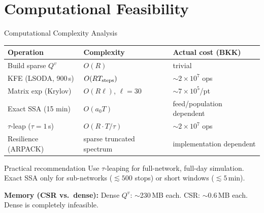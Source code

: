 \documentclass[aspectratio=169,12pt]{beamer}
\begin{document}
\section{Computational Feasibility}
\begin{frame}{Computational Complexity Analysis}
\begin{center}
\begin{tabular}{lll}
\toprule
Operation & Complexity & Actual cost (BKK) \\
\midrule
Build sparse $Q^v$          & $O(R)$               & trivial \\
KFE (LSODA, 900\,s)         & $O(R T_{\rm steps})$ & $\sim2\times10^7$ ops \\
Matrix exp (Krylov)         & $O(R\ell)$, $\ell=30$& $\sim7\times10^5$/pt \\
Exact SSA (15 min)          & $O(a_0 T)$ & feed/population dependent \\
$\tau$-leap ($\tau=1$\,s)   & $O(R\cdot T/\tau)$   & $\sim2\times10^7$ ops \\
Resilience (ARPACK)         & sparse truncated spectrum & implementation dependent \\
\bottomrule
\end{tabular}
\end{center}

\begin{block}{Practical recommendation}
Use $\tau$-leaping for full-network, full-day simulation.
Exact SSA only for sub-networks ($\lesssim500$ stops) or short windows ($\lesssim5$\,min).
\end{block}

\textbf{Memory (CSR vs.\ dense):} Dense $Q^v$: $\sim$230\,MB each.
CSR: $\sim$0.6\,MB each. Dense is completely infeasible.
\end{frame}
\end{document}
